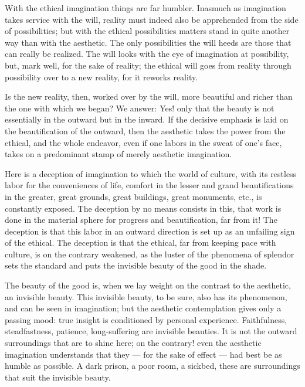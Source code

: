 \documentclass[12pt,a4paper,openany]{book}
\newcommand{\opage}[1]{\marginnote{\footnotesize\textit{[#1]}}}
\begin{document}
With the ethical imagination things are far humbler. Inasmuch as imagination takes service with the will, reality must indeed also be apprehended from the side of possibilities; but with the ethical possibilities matters stand in quite another way than with the aesthetic. The only possibilities the will heeds are those that can really be realized. The will looks with the eye of imagination at possibility, but, mark well, for the sake of reality; the ethical will goes from reality
\setcounter{footnote}{0}%
\opage{90}through possibility over to a new reality, for it reworks reality.

Is the new reality, then, worked over by the will, more beautiful and richer than the one with which we began? We answer: Yes! only that the beauty is not essentially in the outward but in the inward. If the decisive emphasis is laid on the beautification of the outward, then the aesthetic takes the power from the ethical, and the whole endeavor, even if one labors in the sweat of one's face, takes on a predominant stamp of merely aesthetic imagination.

Here is a deception of imagination to which the world of culture, with its restless labor for the conveniences of life, comfort in the lesser and grand beautifications in the greater, great grounds, great buildings, great monuments, etc., is constantly exposed. The deception by no means consists in this, that work is done in the material sphere for progress and beautification, far from it! The deception is that this labor in an outward direction is set up as an unfailing sign of the ethical. The deception is that the ethical, far from keeping pace with culture, is on the contrary weakened, as the luster of the phenomena of splendor sets the standard and puts the invisible beauty of the good in the shade.

The beauty of the good is, when we lay weight on the contrast to the aesthetic, an invisible beauty. This invisible beauty, to be sure, also has its phenomenon, and can be seen in imagination; but the aesthetic contemplation gives only a passing mood: true insight is conditioned by personal experience. Faithfulness, steadfastness, patience, long-suffering are invisible beauties. It is not the outward surroundings that are to shine here; on the contrary! even the aesthetic
\setcounter{footnote}{0}%
\opage{91}imagination understands that they --- for the sake of effect --- had best be as humble as possible. A dark prison, a poor room, a sickbed, these are surroundings that suit the invisible beauty.
\end{document}
